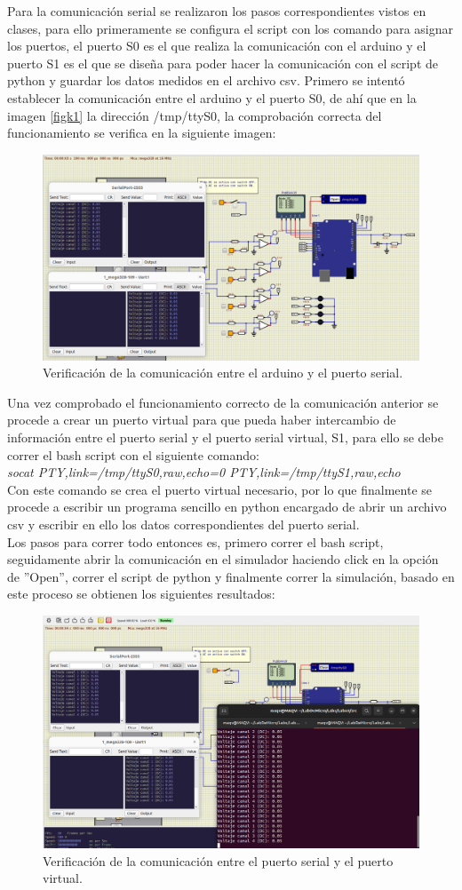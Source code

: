 Para la comunicación serial se realizaron los pasos correspondientes vistos en clases, para ello primeramente se configura el script con los comando para asignar los puertos, el puerto S0 es el que realiza la comunicación con el arduino y el puerto S1 es el que se diseña para poder hacer la comunicación con el script de python y guardar los datos medidos en el archivo csv.
Primero se intentó establecer la comunicación entre el arduino y el puerto S0, de ahí que en la imagen \ref{figk1} la dirección /tmp/ttyS0, la comprobación correcta del funcionamiento se verifica en la siguiente imagen: 
\begin{figure}[H]
    \centering
    \includegraphics[width=.8\linewidth]{Imagenes/8a.png}
    \caption{Verificación de la comunicación entre el arduino y el puerto serial.}
    \label{figk2}
\end{figure}
Una vez comprobado el funcionamiento correcto de la comunicación anterior se procede a crear un puerto virtual para que pueda haber intercambio de información entre el puerto serial y el puerto serial virtual, S1, para ello se debe correr el bash script con el siguiente comando:\\
\textit{socat PTY,link=/tmp/ttyS0,raw,echo=0 PTY,link=/tmp/ttyS1,raw,echo}\\
Con este comando se crea el puerto virtual necesario, por lo que finalmente se procede a escribir un programa sencillo en python encargado de abrir un archivo csv y escribir en ello los datos correspondientes del puerto serial.\\
Los pasos para correr todo entonces es, primero correr el bash script, seguidamente abrir la comunicación en el simulador haciendo click en la opción de ''Open'', correr el script de python y finalmente correr la simulación, basado en este proceso se obtienen los siguientes resultados:
\begin{figure}[H]
    \centering
    \includegraphics[width=.8\linewidth]{Imagenes/8b.png}
    \caption{Verificación de la comunicación entre el puerto serial y el puerto virtual.}
    \label{figk3}
\end{figure}
